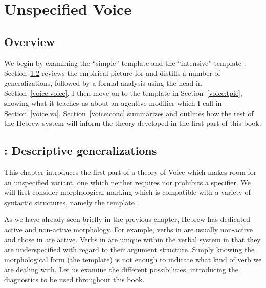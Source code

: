\chapter{Unspecified Voice}
\label{chap:voice}

\section{Overview} \label{voice:intro}
We begin by examining the ``simple'' template {\tkal} and the ``intensive'' template {\tpie}. Section~\ref{voice:tkal} reviews the empirical picture for {\tkal} and distills a number of generalizations, followed by a formal analysis using the  head in Section~\ref{voice:voice}. I then move on to the template {\tpie} in Section~\ref{voice:tpie}, showing what it teaches us about an agentive modifier which I call {\va} in Section~\ref{voice:va}. Section~\ref{voice:conc} summarizes and outlines how the rest of the Hebrew system will inform the theory developed in the first part of this book.

\section{\tkal: Descriptive generalizations} \label{voice:tkal}
This chapter introduces the first part of a theory of Voice which makes room for an unspecified variant, one which neither requires nor prohibits a specifier. We will first consider morphological marking which is compatible with a variety of syntactic structures, namely the template {\tkal}.

As we have already seen briefly in the previous chapter, Hebrew has dedicated active and non-active morphology. For example, verbs in {\tnif} are usually non-active and those in {\thif} are active. Verbs in {\tkal} are unique within the verbal system in that they are underspecified with regard to their argument structure. Simply knowing the morphological form (the template) is not enough to indicate what kind of verb we are dealing with. Let us examine the different possibilities, introducing the diagnostics to be used throughout this book.

